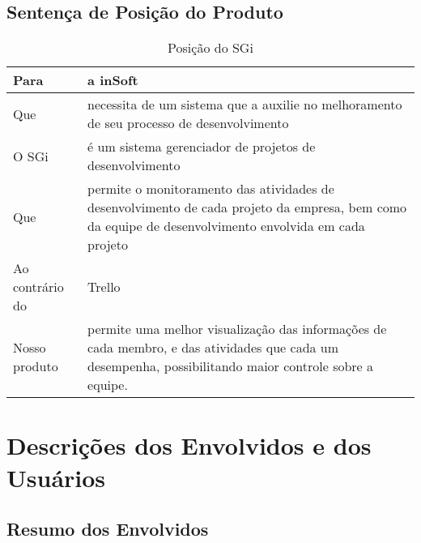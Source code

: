     \subsection{Sentença de Posição do Produto}

      \begin{table}[H]
        \centering
        \begin{tabular}{|>{\columncolor[HTML]{C0C0C0}}p{}|p{}|}
          \hline
          Para            &   a inSoft                                                 \\ \hline
          Que             &   necessita de um sistema que a auxilie no melhoramento de seu processo de desenvolvimento
                                                                                       \\ \hline
          O SGi           &   é um sistema gerenciador de projetos de desenvolvimento  \\ \hline
          Que             &   permite o monitoramento das atividades de desenvolvimento de cada projeto da empresa, bem como da equipe de desenvolvimento envolvida em cada projeto                \\ \hline
          Ao contrário do &   Trello                                                   \\ \hline
          Nosso produto   &   permite uma melhor visualização das informações de cada membro, e das atividades que cada um desempenha, possibilitando maior controle sobre a equipe.               \\ \hline
        \end{tabular}
        \caption{Posição do SGi}
      \end{table}

  \section{Descrições dos Envolvidos e dos Usuários}
    \subsection{Resumo dos Envolvidos}

